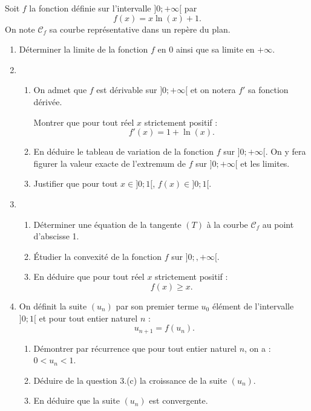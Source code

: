 Soit $f$ la fonction définie sur l'intervalle $]0;+\infty[$ par \[f(x) = x\ln (x) + 1.\]
%
On note $\mathcal{C}_f$ sa courbe représentative dans un repère du plan.

\begin{enumerate}
	\item Déterminer la limite de la fonction $f$ en $0$ ainsi que sa limite en $+\infty$.
	\item 
	\begin{enumerate}
		\item On admet que $f$ est dérivable sur $]0;+\infty[$ et on notera $f'$ sa fonction dérivée.
		
		Montrer que pour tout réel $x$ strictement positif : \[f'(x) = 1 + \ln (x).\]
		\item En déduire le tableau de variation de la fonction $f$ sur $]0;+\infty[$. On y fera figurer la valeur exacte de l'extremum de $f$ sur $]0;+\infty[$ et les limites.
		\item Justifier que pour tout $x \in  ]0;1[$, $f(x) \in  ]0;1[$.
	\end{enumerate}	
	\item 
	\begin{enumerate}
		\item Déterminer une équation de la tangente $(T)$ à la courbe $\mathcal{C}_f$ au point d'abscisse 1.
		\item Étudier la convexité de la fonction $f$ sur $]0;,+\infty[$.
		\item En déduire que pour tout réel $x$ strictement positif : \[f(x) \geqslant x.\]
	\end{enumerate}
	\item On définit la suite $\left(u_n\right)$ par son premier terme $u_0$ élément de l'intervalle $]0;1[$ et pour tout entier naturel $n$ : \[u_{n+1} = f\left(u_n\right).\]
	\begin{enumerate}
		\item Démontrer par récurrence que pour tout entier naturel $n$, on a : $0 < u_n < 1$.
		\item Déduire de la question 3.(c) la croissance de la suite $\left(u_n\right)$.
		\item En déduire que la suite $\left(u_n\right)$ est convergente.
	\end{enumerate}
\end{enumerate}

